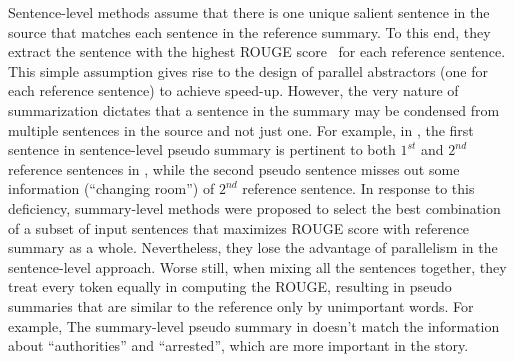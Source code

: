 Sentence-level methods assume that there is 
one unique salient sentence in the source that matches each sentence
in the reference summary. To this end,
they extract the sentence with the highest ROUGE score~\cite{rouge}  
for each reference sentence. This simple assumption gives rise to
the design of parallel abstractors (one for each reference sentence)
to achieve speed-up.
However, the very nature of summarization dictates that a sentence in the
summary may be condensed from multiple sentences in the source and not just one.
For example, in , the first sentence in 
sentence-level pseudo summary is pertinent to both $1^{st}$ and $2^{nd}$ 
reference sentences in , while the second pseudo sentence 
misses out some information (``changing room'') of $2^{nd}$ reference 
sentence.
In response to this deficiency, summary-level 
methods
were proposed to select the best combination of a subset of input sentences
that maximizes ROUGE score with reference summary as a whole.
Nevertheless, they lose the advantage of parallelism in the sentence-level approach.
Worse still, when mixing all the sentences together, they treat every token
equally in computing the ROUGE, resulting in pseudo summaries that are similar
to the reference only by unimportant words. 
For example, The summary-level pseudo summary in  doesn't
match the information about ``authorities'' and ``arrested'', which are
more important in the story.

